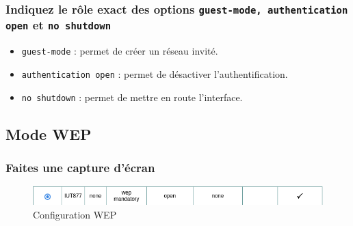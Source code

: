 \documentclass[12pt, a4paper]{article}
\begin{document}
        \subsubsection{Indiquez le rôle exact des options \texttt{guest-mode, authentication open} et \texttt{no shutdown}}
        \begin{itemize}
            \item \texttt{guest-mode} : permet de créer un réseau invité.
            \item \texttt{authentication open} : permet de désactiver l'authentification.
            \item \texttt{no shutdown} : permet de mettre en route l'interface.
        \end{itemize}


    \subsection{Mode WEP}

        \subsubsection{Faites une capture d'écran}
        \begin{figure}[H]
            \centering
            \includegraphics[width=1\textwidth]{img/mode-wep.png}
            \caption{Configuration WEP}
            \label{fig:wep}
        \end{figure}
\end{document}
